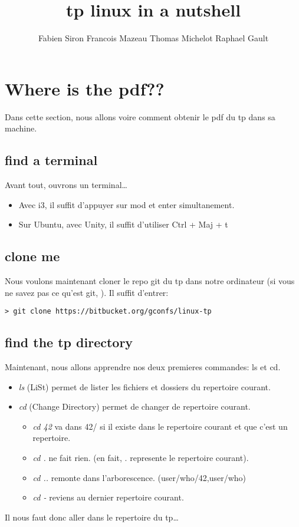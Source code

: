 \documentclass[a4paper]{article}
\title{tp \- linux in a nutshell}
\author{Fabien Siron \- Francois Mazeau \- Thomas Michelot \- Raphael Gault}
\begin{document}
\lstset{language=bash}
\maketitle
\newpage
\tableofcontents
\newpage
\section{Where is the pdf??}
Dans cette section, nous allons voire comment obtenir le pdf du tp dans
sa machine.
\subsection{find a terminal}
Avant tout, ouvrons un terminal\ldots 
\begin{itemize}
  \item Avec i3, il suffit d'appuyer sur mod et enter simultanement.
  \item Sur Ubuntu, avec Unity, il suffit d'utiliser Ctrl + Maj + t  %
\end{itemize}
\subsection{clone me}
Nous voulons maintenant cloner le repo git du tp dans notre ordinateur (si vous
ne savez pas ce qu'est git, %
).
Il suffit d'entrer:
\begin{lstlisting}
> git clone https://bitbucket.org/gconfs/linux-tp
\end{lstlisting}

\subsection{find the tp directory}
Maintenant, nous allons apprendre nos deux premieres commandes: ls et cd.
\begin{itemize}
  \item \emph{ls} (LiSt) permet de lister les fichiers et dossiers du repertoire
    courant.
  \item \emph{cd} (Change Directory) permet de changer de repertoire courant.
    \begin{itemize}
      \item \emph{cd 42} va dans 42/ si il existe dans le repertoire courant et que
        c'est un repertoire.
      \item \emph{cd . } ne fait rien. (en fait, . represente le repertoire
        courant).
      \item \emph{cd ..} remonte dans l'arborescence. (user/who/42,user/who)
      \item \emph{cd -} reviens au dernier repertoire courant.
    \end{itemize}
\end{itemize}
Il nous faut donc aller dans le repertoire du tp\ldots
\end{document}
